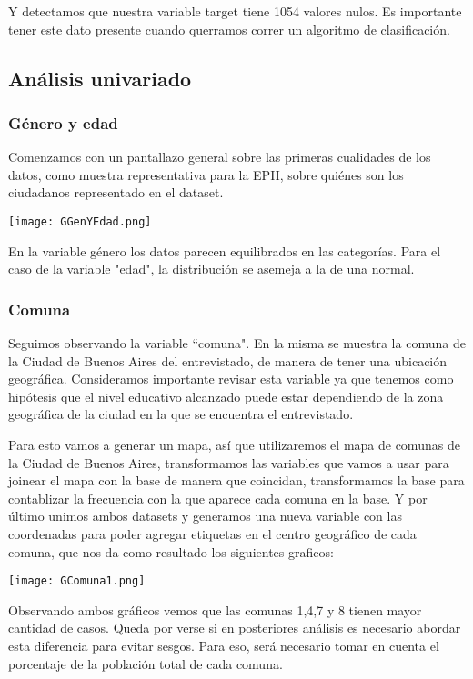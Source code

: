 \documentclass[a4paper]{article}
\begin{document}
    Y detectamos que nuestra variable target tiene 1054 valores nulos. Es importante tener este dato presente cuando querramos correr un algoritmo de clasificación.
    
    \subsection{Análisis univariado}
    
        \subsubsection{Género y edad}
        
            Comenzamos con un pantallazo general sobre las primeras cualidades de los datos, como muestra representativa para la EPH, sobre quiénes son los ciudadanos representado en el dataset.
        
            \texttt{[image: GGenYEdad.png]}

            En la variable género los datos parecen equilibrados en las categorías. Para el caso de la variable "edad", la distribución se asemeja a la de una normal.
        
        \subsubsection{Comuna}
        
            Seguimos observando la variable ``comuna". En la misma se muestra la comuna de la Ciudad de Buenos Aires del entrevistado, de manera de tener una ubicación geográfica. Consideramos importante revisar esta variable ya que tenemos como hipótesis que el nivel educativo alcanzado puede estar dependiendo de la zona geográfica de la ciudad en la que se encuentra el entrevistado.
        
            Para esto vamos a generar un mapa, así que utilizaremos el mapa de comunas de la Ciudad de Buenos Aires, transformamos las variables que vamos a usar para joinear el mapa con la base de manera que coincidan, transformamos la base para contablizar la frecuencia con la que aparece cada comuna en la base. Y por último unimos ambos datasets y generamos una nueva variable con las coordenadas para poder agregar etiquetas en el centro geográfico de cada comuna, que nos da como resultado los siguientes graficos:
        
            \texttt{[image: GComuna1.png]}

            Observando ambos gráficos vemos que las comunas 1,4,7 y 8 tienen mayor cantidad de casos. Queda por verse si en posteriores análisis es necesario abordar esta diferencia para evitar sesgos. Para eso, será necesario tomar en cuenta el porcentaje de la población total de cada comuna.
        
\end{document}
